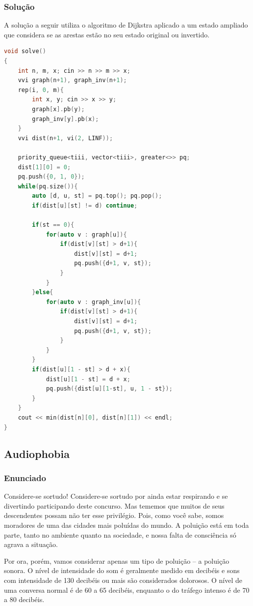 \subsubsection*{Solução}
A solução a seguir utiliza o algoritmo de Dijkstra aplicado a um estado ampliado que considera se as arestas estão no seu estado original ou invertido.

\begin{lstlisting}[language=C++]
void solve()
{
    int n, m, x; cin >> n >> m >> x;
    vvi graph(n+1), graph_inv(n+1);
    rep(i, 0, m){
        int x, y; cin >> x >> y;
        graph[x].pb(y);
        graph_inv[y].pb(x);
    }
    vvi dist(n+1, vi(2, LINF));

    priority_queue<tiii, vector<tiii>, greater<>> pq;
    dist[1][0] = 0;
    pq.push({0, 1, 0});
    while(pq.size()){
        auto [d, u, st] = pq.top(); pq.pop();
        if(dist[u][st] != d) continue;

        if(st == 0){
            for(auto v : graph[u]){
                if(dist[v][st] > d+1){
                    dist[v][st] = d+1;
                    pq.push({d+1, v, st});
                }
            }
        }else{
            for(auto v : graph_inv[u]){
                if(dist[v][st] > d+1){
                    dist[v][st] = d+1;
                    pq.push({d+1, v, st});
                }
            }
        }
        if(dist[u][1 - st] > d + x){
            dist[u][1 - st] = d + x;
            pq.push({dist[u][1-st], u, 1 - st});
        }
    }
    cout << min(dist[n][0], dist[n][1]) << endl;
}
\end{lstlisting}

\subsection{Audiophobia}

\subsubsection*{Enunciado}
Considere-se sortudo! Considere-se sortudo por ainda estar respirando e se divertindo participando deste concurso. Mas tememos que muitos de seus descendentes possam não ter esse privilégio. Pois, como você sabe, somos moradores de uma das cidades mais poluídas do mundo. A poluição está em toda parte, tanto no ambiente quanto na sociedade, e nossa falta de consciência só agrava a situação.

Por ora, porém, vamos considerar apenas um tipo de poluição – a poluição sonora. O nível de intensidade do som é geralmente medido em decibéis e sons com intensidade de 130 decibéis ou mais são considerados dolorosos. O nível de uma conversa normal é de 60 a 65 decibéis, enquanto o do tráfego intenso é de 70 a 80 decibéis.

